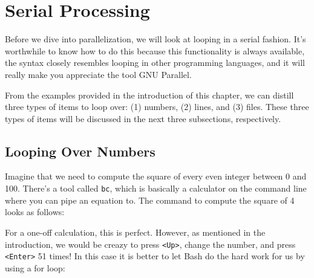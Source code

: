 \documentclass[
]{book}
\newenvironment{Shaded}{\begin{snugshade}}{\end{snugshade}}
\newcommand{\BuiltInTok}[1]{#1}
\newcommand{\DataTypeTok}[1]{\textcolor[rgb]{0.13,0.29,0.53}{#1}}
\newcommand{\ExtensionTok}[1]{#1}
\newcommand{\FunctionTok}[1]{\textcolor[rgb]{0.00,0.00,0.00}{#1}}
\newcommand{\KeywordTok}[1]{\textcolor[rgb]{0.13,0.29,0.53}{\textbf{#1}}}
\newcommand{\NormalTok}[1]{#1}
\newcommand{\OperatorTok}[1]{\textcolor[rgb]{0.81,0.36,0.00}{\textbf{#1}}}
\newcommand{\StringTok}[1]{\textcolor[rgb]{0.31,0.60,0.02}{#1}}
\newcommand{\VariableTok}[1]{\textcolor[rgb]{0.00,0.00,0.00}{#1}}
\theoremstyle{definition}
\theoremstyle{definition}
\theoremstyle{definition}
\theoremstyle{remark}
\begin{document}
\hypertarget{serial-processing}{%
\section{Serial Processing}\label{serial-processing}}

Before we dive into parallelization, we will look at looping in a serial fashion. It's worthwhile to know how to do this because this functionality is always available, the syntax closely resembles looping in other programming languages, and it will really make you appreciate the tool GNU Parallel.

From the examples provided in the introduction of this chapter, we can distill three types of items to loop over: (1) numbers, (2) lines, and (3) files. These three types of items will be discussed in the next three subsections, respectively.

\hypertarget{looping-over-numbers}{%
\subsection{Looping Over Numbers}\label{looping-over-numbers}}

Imagine that we need to compute the square of every even integer between 0 and 100. There's a tool called \texttt{bc}, which is basically a calculator on the command line where you can pipe an equation to. The command to compute the square of 4 looks as follows:

\begin{Shaded}
\end{Shaded}

For a one-off calculation, this is perfect. However, as mentioned in the introduction, we would be creazy to press \texttt{\textless{}Up\textgreater{}}, change the number, and press \texttt{\textless{}Enter\textgreater{}} 51 times! In this case it is better to let Bash do the hard work for us by using a for loop:

\begin{Shaded}
\end{Shaded}
\end{document}
